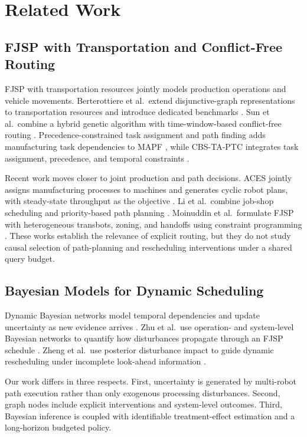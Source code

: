 \documentclass[11pt,a4paper]{article}
\begin{document}
\section{Related Work}
\label{sec:related}

\subsection{FJSP with Transportation and Conflict-Free Routing}

FJSP with transportation resources jointly models production operations and
vehicle movements. Berterottiere et al.\ extend disjunctive-graph representations
to transportation resources and introduce dedicated benchmarks
\citep{berterottiere2024}. Sun et al.\ combine a hybrid genetic algorithm with
time-window-based conflict-free routing \citep{sun2023}. Precedence-constrained
task assignment and path finding adds manufacturing task dependencies to MAPF
\citep{liu2024}, while CBS-TA-PTC integrates task assignment, precedence, and
temporal constraints \citep{chong2024}.

Recent work moves closer to joint production and path decisions. ACES jointly
assigns manufacturing processes to machines and generates cyclic robot plans,
with steady-state throughput as the objective \citep{leet2025}. Li et al.\
combine job-shop scheduling and priority-based path planning
\citep{li2026}. Moinuddin et al.\ formulate FJSP with heterogeneous transbots,
zoning, and handoffs using constraint programming \citep{moinuddin2026}.
These works establish the relevance of explicit routing, but they do not study
causal selection of path-planning and rescheduling interventions under a shared
query budget.

\subsection{Bayesian Models for Dynamic Scheduling}

Dynamic Bayesian networks model temporal dependencies and update uncertainty as
new evidence arrives \citep{kungurtsev2024}. Zhu et al.\ use operation- and
system-level Bayesian networks to quantify how disturbances propagate through
an FJSP schedule \citep{zhu2026}. Zheng et al.\ use posterior disturbance impact
to guide dynamic rescheduling under incomplete look-ahead information
\citep{zheng2025}.

Our work differs in three respects. First, uncertainty is generated by
multi-robot path execution rather than only exogenous processing disturbances.
Second, graph nodes include explicit interventions and system-level outcomes.
Third, Bayesian inference is coupled with identifiable treatment-effect
estimation and a long-horizon budgeted policy.
\end{document}
